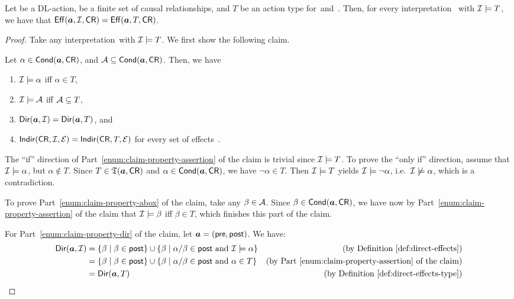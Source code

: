 \begin{lemma}\label{lem:effects-by-type}
    Let \abf be a DL-action, \CR be a finite set of causal relationships, and
    $T$ be an action type for~\abf and~\CR.  Then, for every interpretation~\Imc
    with $\mathcal{I}\models T$, we have that $\operatorname{\mathsf{Eff}}(\boldsymbol a,\mathcal{I},\mathsf{CR})=\operatorname{\mathsf{Eff}}(\boldsymbol a,T,\mathsf{CR})$.
\end{lemma}

\begin{proof}
    Take any interpretation~\Imc with $\mathcal{I}\models T$.  We first show the
    following claim.

    \begin{claim}\label{claim:cond}
        Let $\alpha\in\operatorname{\mathsf{Cond}}(\boldsymbol a,\mathsf{CR})$, and $\mathcal{A}\subseteq\operatorname{\mathsf{Cond}}(\boldsymbol a,\mathsf{CR})$.
        Then, we have
        \begin{enumerate}
            \item\label{enum:claim-property-assertion}
                $\mathcal{I}\models\alpha$ iff $\alpha\in T$,
            \item\label{enum:claim-property-abox}
                $\mathcal{I}\models\mathcal{A}$ iff $\mathcal{A}\subseteq T$,
            \item\label{enum:claim-property-dir}
                $\operatorname{\mathsf{Dir}}(\boldsymbol a,\mathcal{I})=\operatorname{\mathsf{Dir}}(\boldsymbol a,T)$, and
            \item\label{enum:claim-property-indir}
                $\operatorname{\mathsf{Indir}}(\mathsf{CR},\mathcal{I},\mathcal{E})=\operatorname{\mathsf{Indir}}(\mathsf{CR},T,\mathcal{E})$ for every set of
                effects~\Emc.
        \end{enumerate}
    \end{claim}

    \noindent
    The \enquote{if} direction of Part~\ref{enum:claim-property-assertion} of
    the claim is trivial since $\mathcal{I}\models T$.  To prove the \enquote{only if}
    direction, assume that $\mathcal{I}\models\alpha$, but $\alpha\notin T$.  Since
    $T\in\mathfrak{T}(\boldsymbol a,\mathsf{CR})$ and $\alpha\in\operatorname{\mathsf{Cond}}(\boldsymbol a,\mathsf{CR})$, we have $\lnot\alpha\in
    T$.  Then $\mathcal{I}\models T$ yields $\mathcal{I}\models\lnot\alpha$,
    i.e.~$\mathcal{I}\not\models\alpha$, which is a contradiction.

    To prove Part~\ref{enum:claim-property-abox} of the claim, take any
    $\beta\in\mathcal{A}$.  Since $\beta\in\operatorname{\mathsf{Cond}}(\boldsymbol a,\mathsf{CR})$, we have now by
    Part~\ref{enum:claim-property-assertion} of the claim that
    $\mathcal{I}\models\beta$ iff $\beta\in T$, which finishes this part of the claim.

    For Part~\ref{enum:claim-property-dir} of the claim, let
    $\boldsymbol a=(\mathsf{pre},\mathsf{post})$.  We have:
    \begin{align*}
        \Dir(\abf,\Imc)
        &=\{\beta\mid\beta\in\post\}\cup\{\beta\mid\alpha/\beta\in\post\ \text{and}\ \Imc\models\alpha\}
        &\text{(by Definition~\ref{def:direct-effects})}\\
        &=\{\beta\mid\beta\in\post\}\cup\{\beta\mid\alpha/\beta\in\post\ \text{and}\ \alpha\in T\}
        &\text{(by Part~\ref{enum:claim-property-assertion} of the claim)}\\
        &=\Dir(\abf,T)
        &\text{(by Definition~\ref{def:direct-effects-type})}
    \end{align*}


\end{proof}
